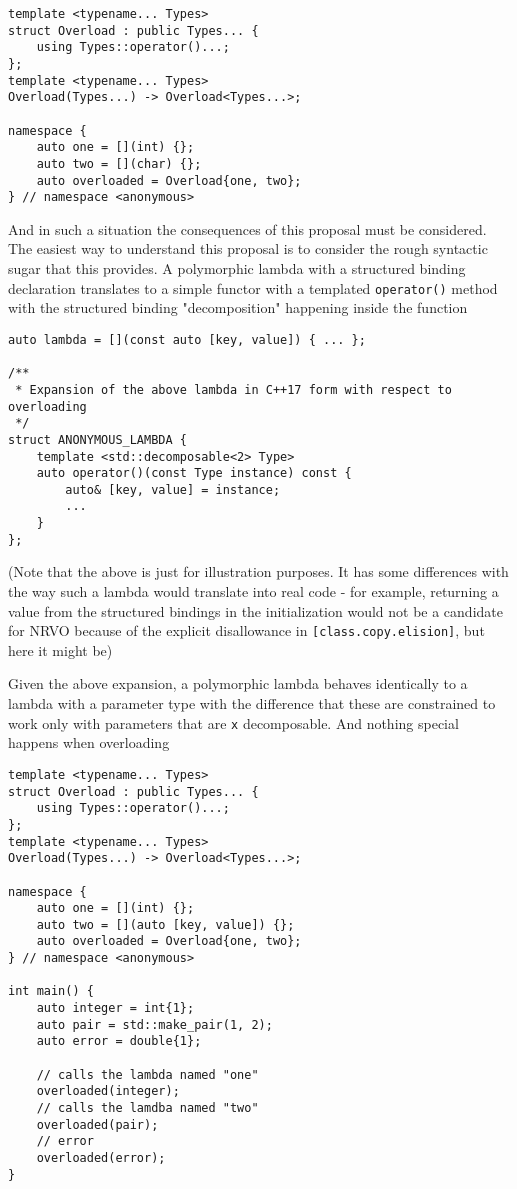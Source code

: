 \documentclass{article}
\begin{document}
\begin{lstlisting}
template <typename... Types>
struct Overload : public Types... {
    using Types::operator()...;
};
template <typename... Types>
Overload(Types...) -> Overload<Types...>;

namespace {
    auto one = [](int) {};
    auto two = [](char) {};
    auto overloaded = Overload{one, two};
} // namespace <anonymous>
\end{lstlisting}

And in such a situation the consequences of this proposal must be considered.
The easiest way to understand this proposal is to consider the rough syntactic
sugar that this provides.  A polymorphic lambda with a structured binding
declaration translates to a simple functor with a templated
\texttt{operator()} method with the structured binding "decomposition"
happening inside the function

\begin{lstlisting}
auto lambda = [](const auto [key, value]) { ... };

/**
 * Expansion of the above lambda in C++17 form with respect to overloading
 */
struct ANONYMOUS_LAMBDA {
    template <std::decomposable<2> Type>
    auto operator()(const Type instance) const {
        auto& [key, value] = instance;
        ...
    }
};
\end{lstlisting}

(Note that the above is just for illustration purposes.  It has some
differences with the way such a lambda would translate into real code - for
example, returning a value from the structured bindings in the initialization
would not be a candidate for NRVO because of the explicit disallowance in
\texttt{[class.copy.elision]}, but here it might be)

Given the above expansion, a polymorphic lambda behaves identically to a
lambda with a  parameter type with the difference that these are
constrained to work only with parameters that are \texttt{x} decomposable.
And nothing special happens when overloading

\begin{lstlisting}
template <typename... Types>
struct Overload : public Types... {
    using Types::operator()...;
};
template <typename... Types>
Overload(Types...) -> Overload<Types...>;

namespace {
    auto one = [](int) {};
    auto two = [](auto [key, value]) {};
    auto overloaded = Overload{one, two};
} // namespace <anonymous>

int main() {
    auto integer = int{1};
    auto pair = std::make_pair(1, 2);
    auto error = double{1};

    // calls the lambda named "one"
    overloaded(integer);
    // calls the lamdba named "two"
    overloaded(pair);
    // error
    overloaded(error);
}
\end{lstlisting}
\end{document}
